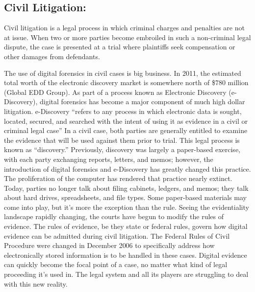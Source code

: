 \documentclass[british]{article}
\begin{document}
\subsection{Civil Litigation:}

Civil litigation is a legal process in which criminal charges and
penalties are not at issue. When two or more parties become embroiled
in such a non-criminal legal dispute, the case is presented at a trial
where plaintiffs seek compensation or other damages from defendants.

The use of digital forensics in civil cases is big business. In 2011,
the estimated total worth of the electronic discovery market is somewhere
north of \$780 million (Global EDD Group). As part of a process known
as Electronic Discovery (e-Discovery), digital forensics has become
a major component of much high dollar litigation. e-Discovery ``refers
to any process in which electronic data is sought, located, secured,
and searched with the intent of using it as evidence in a civil or
criminal legal case'' In a civil case, both parties are generally
entitled to examine the evidence that will be used against them prior
to trial. This legal process is known as ``discovery.'' Previously,
discovery was largely a paper-based exercise, with each party exchanging
reports, letters, and memos; however, the introduction of digital
forensics and e-Discovery has greatly changed this practice. The proliferation
of the computer has rendered that practice nearly extinct. Today,
parties no longer talk about filing cabinets, ledgers, and memos;
they talk about hard drives, spreadsheets, and file types. Some paper-based
materials may come into play, but it's more the exception than the
rule. Seeing the evidentiality landscape rapidly changing, the courts
have begun to modify the rules of evidence. The rules of evidence,
be they state or federal rules, govern how digital evidence can be
admitted during civil litigation. The Federal Rules of Civil Procedure
were changed in December 2006 to specifically address how electronically
stored information is to be handled in these cases. Digital evidence
can quickly become the focal point of a case, no matter what kind
of legal proceeding it's used in. The legal system and all its players
are struggling to deal with this new reality.
\end{document}
